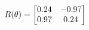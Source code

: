 \documentclass[preview]{standalone}
\begin{document}
\begin{align*}
\special{dvisvgm:raw <g id='unique000'>}R(\theta) = \begin{bmatrix}0.24 & -0.97\\0.97 & 0.24\end{bmatrix}\special{dvisvgm:raw </g>}
\end{align*}
\end{document}
